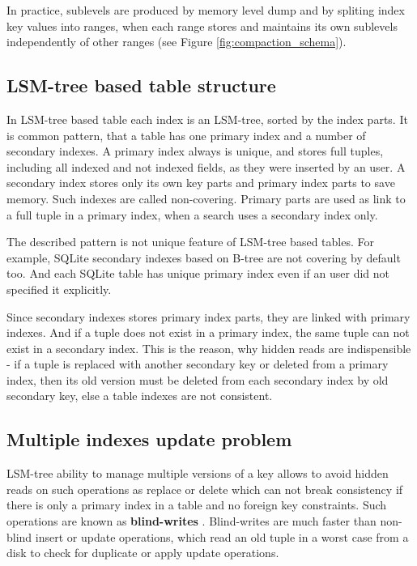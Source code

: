 \documentclass{vldb}
\begin{document}
In practice, sublevels are produced by memory level dump and by spliting index
key values into ranges, when each range stores and maintains its own sublevels
independently of other ranges (see Figure \ref{fig:compaction_schema}).

\subsection{LSM-tree based table structure}
In LSM-tree based table each index is an LSM-tree, sorted by the index parts.
It is common pattern, that a table has one primary index and a number of
secondary indexes. A primary index always is unique, and stores full tuples,
including all indexed and not indexed fields, as they were inserted by an user.
A secondary index stores only its own key parts and primary index parts to save
memory. Such indexes are called non-covering. Primary parts are used as link to
a full tuple in a primary index, when a search uses a secondary index only.

The described pattern is not unique feature of LSM-tree based tables. For
example, SQLite secondary indexes based on B-tree are not covering by default
too. And each SQLite table has unique primary index even if an user did not
specified it explicitly.

Since secondary indexes stores primary index parts, they are linked with primary
indexes. And if a tuple does not exist in a primary index, the same tuple can
not exist in a secondary index. This is the reason, why hidden reads are
indispensible - if a tuple is replaced with another secondary key or deleted
from a primary index, then its old version must be deleted from each secondary
index by old secondary key, else a table indexes are not consistent.

\subsection{Multiple indexes update problem}
LSM-tree ability to manage multiple versions of a key allows to avoid hidden
reads on such operations as replace or delete which can not break consistency if
there is only a primary index in a table and no foreign key constraints.
Such operations are known as \textbf{blind-writes} \cite{kai:slimdb}.
Blind-writes are much faster than non-blind insert or update operations, which
read an old tuple in a worst case from a disk to check for duplicate or apply
update operations.
\end{document}
